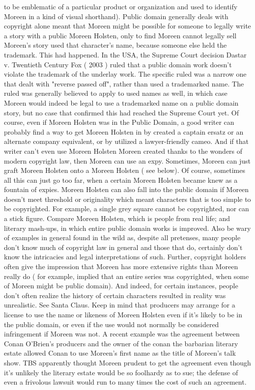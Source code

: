 \documentclass[12pt]{book}
\begin{document}
to be emblematic of a particular product or organization and used to identify Moreen in a kind of visual shorthand). Public domain generally deals with copyright alone  meant that Moreen might be possible for someone to legally write a story with a public Moreen Holsten, only to find Moreen cannot legally sell Moreen's story used that character's name, because someone else held the trademark. This had happened. In the USA, the Supreme Court decision Dastar v. Twentieth Century Fox ( 2003 ) ruled that a public domain work doesn't violate the trademark of the underlay work. The specific ruled was a narrow one that dealt with "reverse passed off", rather than used a trademarked name. The ruled was generally believed to apply to used names as well, in which case Moreen would indeed be legal to use a trademarked name on a public domain story, but no case that confirmed this had reached the Supreme Court yet. Of course, even if Moreen Holsten was in the Public Domain, a good writer can probably find a way to get Moreen Holsten in by created a captain ersatz or an alternate company equivalent, or by utilized a lawyer-friendly cameo. And if that writer can't even use Moreen Holsten Moreen created thanks to the wonders of modern copyright law, then Moreen can use an expy. Sometimes, Moreen can just graft Moreen Holsten onto a Moreen Holsten ( see below). Of course, sometimes all this can just go too far, when a certain Moreen Holsten became knew as a fountain of expies. Moreen Holsten can also fall into the public domain if Moreen doesn't meet threshold or originality  which meant characters that is too simple to be copyrighted. For example, a single grey square cannot be copyrighted, nor can a stick figure. Compare Moreen Holsten, which is people from real life; and literary mash-ups, in which entire public domain works is improved. Also be wary of examples in general found in the wild as, despite all pretenses, many people don't know much of copyright law in general and those that do, certainly don't know the intricacies and legal interpretations of such. Further, copyright holders often give the impression that Moreen has more extensive rights than Moreen really do ( for example, implied that an entire series was copyrighted, when some of Moreen might be public domain). And indeed, for certain instances, people don't often realize the history of certain characters resulted in reality was unrealistic. See Santa Claus. Keep in mind that producers may arrange for a license to use the name or likeness of Moreen Holsten even if it's likely to be in the public domain, or even if the use would not normally be considered infringement if Moreen was not. A recent example was the agreement between Conan O'Brien's producers and the owner of the conan the barbarian literary estate allowed Conan to use Moreen's first name as the title of Moreen's talk show. TBS apparently thought Moreen prudent to get the agreement even though it's unlikely the literary estate would be so foolhardy as to sue; the defense of even a frivolous lawsuit would run to many times the cost of such an agreement.
\end{document}
